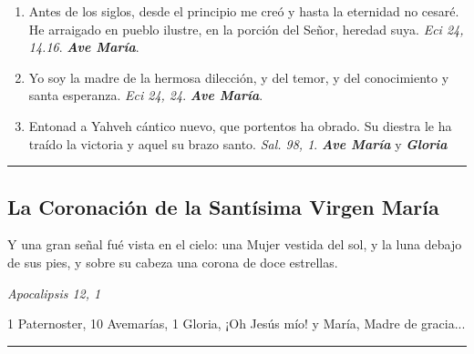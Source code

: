 \documentclass[11pt,a4paper]{book}
\begin{document}
\begin{enumerate}
        \item Antes de los siglos, desde el principio me creó y hasta la eternidad no cesaré. He arraigado en pueblo ilustre, en la porción del Señor, heredad suya. 
            \emph{Eci 24, 14.16}. \textbf{\emph{Ave María}}.

        \item Yo soy la madre de la hermosa dilección, y del temor, y del conocimiento y santa esperanza. \emph{Eci 24, 24}. \textbf{\emph{Ave María}}.

        \item Entonad a Yahveh cántico nuevo, que portentos ha obrado. Su diestra le ha traído la victoria y aquel su brazo santo. \emph{Sal. 98, 1}. 
            \textbf{\emph{Ave María}} y \textbf{\emph{Gloria}}

    \end{enumerate}    

    \rule{\textwidth}{0.5pt}
    

    \subsection*{La Coronación de la Santísima Virgen María}

    Y una gran señal fué vista en el cielo: una Mujer vestida del sol, y la luna debajo de sus pies, y sobre su cabeza una corona de doce estrellas. 

    \begin{flushright}
        \emph{Apocalipsis 12, 1}
    \end{flushright}    

    1 Paternoster, 10 Avemarías, 1 Gloria, ¡Oh Jesús mío! y María, Madre de gracia...

    \rule{\textwidth}{0.5pt}
\end{document}
